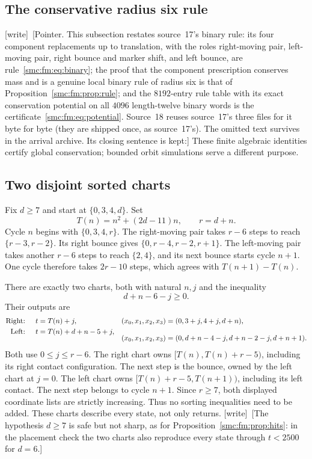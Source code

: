 \documentclass[11pt,letterpaper]{article}
\numberwithin{equation}{section}
\theoremstyle{definition}
\theoremstyle{remark}
\newcommand{\wtag}{\textup{[write]}}
\begin{document}
\subsection{The conservative radius six rule}
\wtag\ [Pointer. This subsection restates source~17's binary rule: its four component replacements up to translation, with the roles right-moving pair, left-moving pair, right bounce and marker shift, and left bounce, are rule~\eqref{smc:fm:eq:binary}; the proof that the component prescription conserves mass and is a genuine local binary rule of radius six is that of Proposition~\ref{smc:fm:prop:rule}; and the $8192$-entry rule table with its exact conservation potential on all $4096$ length-twelve binary words is the certificate~\eqref{smc:fm:eq:potential}. Source~18 reuses source~17's three files for it byte for byte (they are shipped once, as source~17's). The omitted text survives in the arrival archive. Its closing sentence is kept:]
These finite algebraic
identities certify global conservation; bounded orbit simulations serve a
different purpose.

\subsection{Two disjoint sorted charts}
Fix $d\ge7$ and start at $\{0,3,4,d\}$. Set
\[
 T(n)=n^2+(2d-11)n,\qquad r=d+n.
\]
Cycle $n$ begins with $\{0,3,4,r\}$. The right-moving pair takes $r-6$
steps to reach $\{r-3,r-2\}$. Its right bounce gives
$\{0,r-4,r-2,r+1\}$. The left-moving pair takes another $r-6$ steps to
reach $\{2,4\}$, and its next bounce starts cycle $n+1$.
One cycle therefore takes $2r-10$ steps, which agrees with
$T(n+1)-T(n)$.

There are exactly two charts, both with natural $n,j$ and the inequality
\begin{equation}\label{smc:tq:eq:binarydomain}
 d+n-6-j\ge0.
\end{equation}
Their outputs are
\begin{align}
 \text{Right: }\quad t&=T(n)+j, &
 (x_0,x_1,x_2,x_3)&=(0,3+j,4+j,d+n),\label{smc:tq:eq:right}\\
 \text{Left: }\quad t&=T(n)+d+n-5+j, &\notag\\[-6pt]
  && (x_0,x_1,x_2,x_3)&=(0,d+n-4-j,d+n-2-j,d+n+1).\label{smc:tq:eq:left}
\end{align}
Both use $0\le j\le r-6$. The right chart owns
$[T(n),T(n)+r-5)$, including its right contact configuration.
The next step is the bounce, owned by the left chart at $j=0$.
The left chart owns $[T(n)+r-5,T(n+1))$, including its left contact.
The next step belongs to cycle $n+1$. Since $r\ge7$, both displayed
coordinate lists are strictly increasing. Thus no sorting inequalities
need to be added. These charts describe every state, not only returns.
\wtag\ [The hypothesis $d\ge7$ is safe but not sharp, as for Proposition~\ref{smc:fm:prop:hits}: in the placement check the two charts also reproduce every state through $t<2500$ for $d=6$.]
\end{document}
